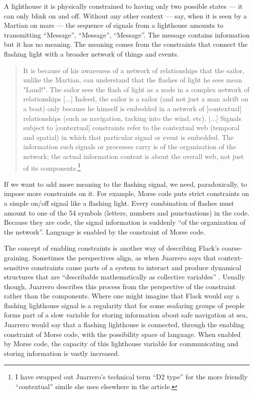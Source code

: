 \documentclass[letterpaper]{article}
\begin{document}
    A lighthouse it is physically constrained to having only two possible states — it can only blink on and off. Without any other context — say, when it is seen by a Martian on mars — the sequence of signals from a lighthouse amounts to transmitting “Message”, “Message”, “Message”. The message contains information but it has no meaning. The meaning comes from the constraints that connect the flashing light with a broader network of things and events.

    \begin{quote}
        It is because of his awareness of a network of relationships that the sailor, unlike the Martian, can understand that the flashes of light he sees mean "Land!". The sailor sees the flash of light as a node in a complex network of relationships [...] Indeed, the sailor is a sailor (and not just a man adrift on a boat) only because he himself is embedded in a network of [contextual] relationships (such as navigation, tacking into the wind, etc). [...] Signals subject to [contextual] constraints refer to the contextual web (temporal and spatial) in which that particular signal or event is embedded. The information such signals or processes carry is of the organization of the network; the actual information content is about the overall web, not just of its components.\footnote{

            I have swapped out Juarrero's technical term “D2 type” for the more friendly “contextual” simile she uses elsewhere in the article.

        } \citep[p.237]{JuarreroCsltyAsCnstrnt1998}
    \end{quote}
    
    If we want to add more meaning to the flashing signal, we need, paradoxically, to impose more constraints on it. For example, Morse code puts strict constraints on a simple on/off signal like a flashing light. Every combination of flashes must amount to one of the 54 symbols (letters, numbers and punctuations) in the code. Because they are code, the signal information is suddenly “of the organization of the network”. Language is enabled by the constraint of Morse code.

    The concept of enabling constraints is another way of describing Flack's coarse-graining. Sometimes the perspectives align, as when Juarrero says that context-sensitive constraints cause parts of a system to interact and produce dynamical structures that are “describable mathematically as collective variables” \citep[p.193]{JuarreroThSlfOrgnstnOfIntntnlActn2004}. Usually though, Juarrero describes this process from the perspective of the constraint rather than the components. Where one might imagine that Flack would say a flashing lighthouse signal is a regularity that for some seafaring groups of people forms part of a slow variable for storing information about safe navigation at sea, Juarrero would say that a flashing lighthouse is connected, through the enabling constraint of Morse code, with the possibility space of language. When enabled by Morse code, the capacity of this lighthouse variable for communicating and storing information is vastly increased.
\end{document}
